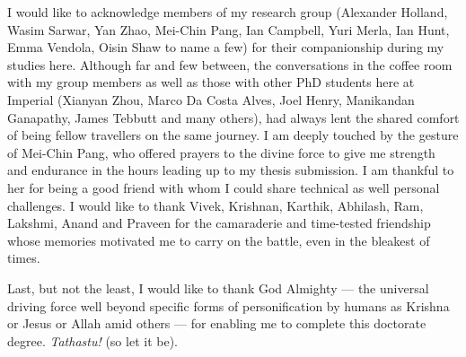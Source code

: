 \addlines[2]

I would like to acknowledge members of my research group (Alexander Holland,
Wasim Sarwar, Yan Zhao, Mei-Chin Pang, Ian Campbell, Yuri Merla, Ian Hunt, Emma
Vendola, Oisin Shaw to name a few) for their companionship during my studies
here. Although far and few between, the conversations in the coffee room with my
group members as well as those with other PhD students here at Imperial (Xianyan
Zhou, Marco Da Costa Alves, Joel Henry, Manikandan Ganapathy, James Tebbutt and
many others), had always lent the shared comfort of being fellow travellers on
the same journey. I am deeply touched by the gesture of Mei-Chin Pang, who
offered prayers to the divine force to give me strength and endurance in the
hours leading up to my thesis submission. I am thankful to her for being a good
friend with whom I could share technical as well personal challenges. I would
like to thank Vivek, Krishnan, Karthik, Abhilash, Ram, Lakshmi, Anand and
Praveen for the camaraderie and time-tested friendship whose memories motivated
me to carry on the  battle, even in the bleakest of times.

Last, but not the least, I would like to thank God Almighty --- the universal
driving force well beyond specific forms of personification by humans as Krishna or
Jesus or Allah amid others --- for enabling me to complete this
doctorate degree. \emph{Tathastu!} (so let it be).

